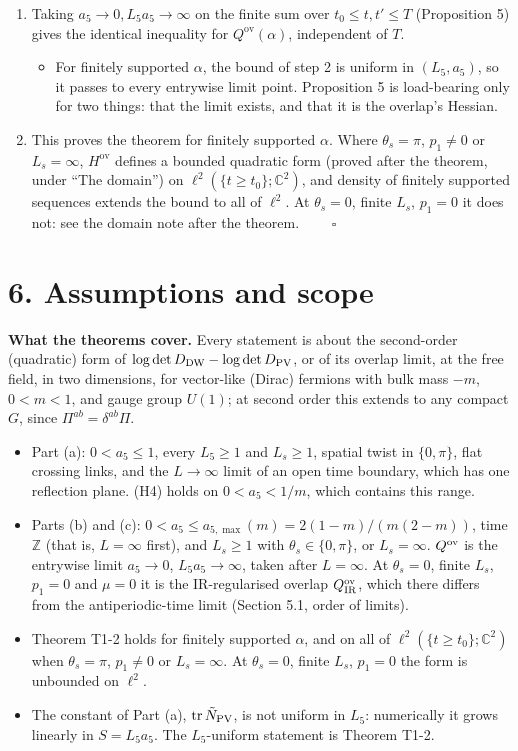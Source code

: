 \documentclass[11pt,a4paper]{article}
\begin{document}
\begin{enumerate}
\item{} Taking $a_5 \to 0, L_5 a_5 \to \infty$ on the finite sum over $t_0 \le t, t' \le T$ (Proposition 5) gives the identical inequality for $Q^{\text{ov}}(\alpha)$, independent of $T$.
\begin{itemize}
\item{} For finitely supported $\alpha$, the bound of step 2 is uniform in $(L_5, a_5)$, so it passes to every entrywise limit point. Proposition 5 is load-bearing only for two things: that the limit exists, and that it is the overlap's Hessian.
\end{itemize}

\item{} This proves the theorem for finitely supported $\alpha$. Where $\theta_s = \pi$, $p_1 \ne 0$ or $L_s = \infty$, $H^{\text{ov}}$ defines a bounded quadratic form (proved after the theorem, under ``The domain'') on $\ell^2(\{t \ge t_0\}; \mathbb{C}^2)$, and density of finitely supported sequences extends the bound to all of $\ell^2$. At $\theta_s = 0$, finite $L_s$, $p_1 = 0$ it does not: see the domain note after the theorem. $\qquad \square$
\end{enumerate}


\section*{6. Assumptions and scope}
{\bfseries\boldmath What the theorems cover.} Every statement is about the second-order (quadratic) form of $\log\det D_{\rm DW}-\log\det D_{\rm PV}$, or of its overlap limit, at the free field, in two dimensions, for vector-like (Dirac) fermions with bulk mass $-m$, $0<m<1$, and gauge group $U(1)$; at second order this extends to any compact $G$, since $\Pi^{ab}=\delta^{ab}\Pi$.

\begin{itemize}
\item{} Part (a): $0<a_5\le 1$, every $L_5\ge1$ and $L_s\ge1$, spatial twist in $\{0,\pi\}$, flat crossing links, and the $L\to\infty$ limit of an open time boundary, which has one reflection plane. (H4) holds on $0<a_5<1/m$, which contains this range.
\item{} Parts (b) and (c): $0<a_5\le a_{5,\max}(m)=2(1-m)/(m(2-m))$, time $\mathbb{Z}$ (that is, $L=\infty$ first), and $L_s\ge1$ with $\theta_s\in\{0,\pi\}$, or $L_s=\infty$. $Q^{\rm ov}$ is the entrywise limit $a_5\to0$, $L_5a_5\to\infty$, taken after $L=\infty$. At $\theta_s=0$, finite $L_s$, $p_1=0$ and $\mu=0$ it is the IR-regularised overlap $Q^{\rm ov}_{\rm IR}$, which there differs from the antiperiodic-time limit (Section 5.1, order of limits).
\item{} Theorem T1-2 holds for finitely supported $\alpha$, and on all of $\ell^2(\{t\ge t_0\};\mathbb{C}^2)$ when $\theta_s=\pi$, $p_1\ne0$ or $L_s=\infty$. At $\theta_s=0$, finite $L_s$, $p_1=0$ the form is unbounded on $\ell^2$.
\item{} The constant of Part (a), $\mathrm{tr}\,\tilde N_{\rm PV}$, is not uniform in $L_5$: numerically it grows linearly in $S=L_5a_5$. The $L_5$-uniform statement is Theorem T1-2.
\end{itemize}
\end{document}
